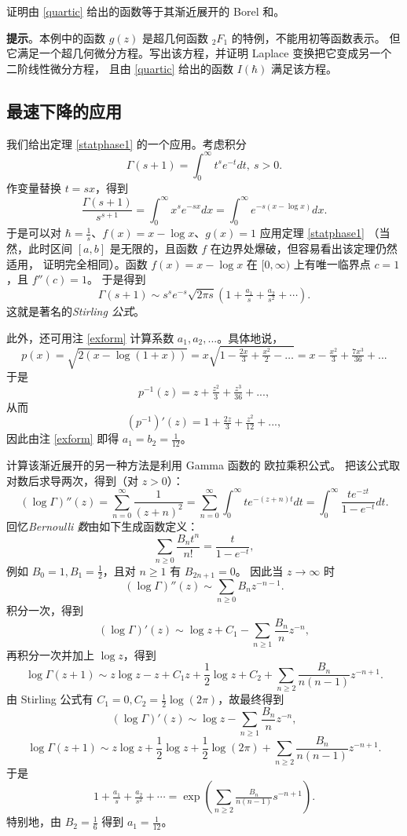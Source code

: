 \begin{exercise} 证明由 \eqref{quartic} 给出的函数等于其渐近展开的 Borel 和。

\textbf{提示}。本例中的函数 $g(z)$ 是超几何函数 ${}_2F_{1}$ 的特例，不能用初等函数表示。
但它满足一个超几何微分方程。写出该方程，并证明 Laplace 变换把它变成另一个二阶线性微分方程，
且由 \eqref{quartic} 给出的函数 $I(\hbar)$ 满足该方程。
\end{exercise} 

\subsection{最速下降的应用}
我们给出定理 \ref{statphase1} 的一个应用。考虑积分
$$
\Gamma(s+1)=\int_0^\infty t^se^{-t}dt,\ s>0.
$$
作变量替换 $t=sx$，得到
$$
\frac{\Gamma(s+1)}{s^{s+1}}=\int_0^\infty x^se^{-sx}dx=
\int_0^\infty e^{-s(x-\log x)}dx.
$$
于是可以对 $\hbar=\frac{1}{s}$、$f(x)=x-\log x$、$g(x)=1$ 应用定理 \ref{statphase1}
（当然，此时区间 $[a,b]$ 是无限的，且函数 $f$ 在边界处爆破，但容易看出该定理仍然适用，
证明完全相同）。函数 $f(x)=x-\log x$ 在 $[0,\infty)$ 上有唯一临界点 $c=1$，且 $f''(c)=1$。
于是得到
\begin{equation}\label{stir}
\Gamma(s+1)\sim s^se^{-s}\sqrt{2\pi s}(1+\tfrac{a_1}{s}+\tfrac{a_2}{s^2}+ \cdots).
\end{equation} 
这就是著名的\emph{Stirling 公式}。

此外，还可用注 \ref{exform} 计算系数 $a_1,a_2,...$。具体地说，
$$
p(x)=\sqrt{2(x-\log(1+x))}=x\sqrt{1-\tfrac{2x}{3}+\tfrac{x^2}{2}-\dots}=x-\tfrac{x^2}{3}+\tfrac{7x^3}{36}+...
$$ 
于是
$$
p^{-1}(z)=z+\tfrac{z^2}{3}+\tfrac{z^3}{36}+...,
$$
从而
$$
(p^{-1})'(z)=1+\tfrac{2z}{3}+\tfrac{z^2}{12}+...,
$$
因此由注 \ref{exform} 即得 $a_1=b_2=\frac{1}{12}$。

\begin{remark} 计算该渐近展开的另一种方法是利用 Gamma 函数的 欧拉乘积公式。
把该公式取对数后求导两次，得到（对 $z>0$）：
$$
(\log \Gamma)''(z)=\sum_{n=0}^\infty\frac{1}{(z+n)^2}=\sum_{n=0}^\infty \int_0^\infty te^{-(z+n)t}dt=
\int_0^\infty \frac{te^{-zt}}{1-e^{-t}}dt. 
$$
回忆\emph{Bernoulli 数}由如下生成函数定义：
$$
\sum_{n\ge 0}\frac{B_nt^n}{n!}=\frac{t}{1-e^{-t}},
$$
例如 $B_0=1,B_1=\frac{1}{2}$，且对 $n\ge 1$ 有 $B_{2n+1}=0$。
因此当 $z\to \infty$ 时
$$
(\log \Gamma)''(z)\sim \sum_{n\ge 0}B_nz^{-n-1}.
$$
积分一次，得到
$$
(\log \Gamma)'(z)\sim \log z+C_1 -\sum_{n\ge 1}\frac{B_n}{n}z^{-n},
$$
再积分一次并加上 $\log z$，得到
$$
\log \Gamma(z+1)\sim z\log z-z +C_1z+\frac{1}{2}\log z+C_2+\sum_{n\ge 2}\frac{B_n}{n(n-1)}z^{-n+1}.
$$
由 Stirling 公式有 $C_1=0,C_2=\frac{1}{2}\log(2\pi)$，故最终得到
\begin{equation}\label{loggapri}
(\log \Gamma)'(z)\sim \log z -\sum_{n\ge 1}\frac{B_n}{n}z^{-n},
\end{equation} 
\begin{equation}\label{loggapri1}
\log \Gamma(z+1)\sim z\log z +\frac{1}{2}\log z +\frac{1}{2}\log(2\pi)+\sum_{n\ge 2}\frac{B_n}{n(n-1)}z^{-n+1}.
\end{equation} 
于是
$$
1+\tfrac{a_1}{s}+\tfrac{a_2}{s^2}+ \cdots=\exp(\sum_{n\ge 2}\tfrac{B_n}{n(n-1)}s^{-n+1}). 
$$
特别地，由 $B_2=\frac{1}{6}$ 得到 $a_1=\frac{1}{12}$。
\end{remark} 

